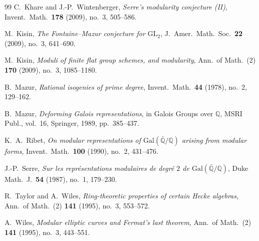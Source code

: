 \documentclass[12pt]{amsart}
\theoremstyle{definition}
\theoremstyle{remark}
\newcommand{\Gal}{\mathrm{Gal}}
\newcommand{\GL}{\mathrm{GL}}
\begin{document}
\begin{thebibliography}{99}
 C.~Khare and J.-P.~Wintenberger, \emph{Serre's modularity conjecture (II)}, Invent.\ Math.\ \textbf{178} (2009), no.~3, 505--586.

 M.~Kisin, \emph{The Fontaine--Mazur conjecture for $\GL_2$}, J.\ Amer.\ Math.\ Soc.\ \textbf{22} (2009), no.~3, 641--690.

 M.~Kisin, \emph{Moduli of finite flat group schemes, and modularity}, Ann.\ of Math.\ (2) \textbf{170} (2009), no.~3, 1085--1180.

 B.~Mazur, \emph{Rational isogenies of prime degree}, Invent.\ Math.\ \textbf{44} (1978), no.~2, 129--162.

 B.~Mazur, \emph{Deforming Galois representations}, in Galois Groups over $\mathbb{Q}$, MSRI Publ., vol.~16, Springer, 1989, pp.~385--437.

 K.~A.~Ribet, \emph{On modular representations of $\Gal(\bar{\mathbb{Q}}/\mathbb{Q})$ arising from modular forms}, Invent.\ Math.\ \textbf{100} (1990), no.~2, 431--476.

 J.-P.~Serre, \emph{Sur les repr\'esentations modulaires de degr\'e $2$ de $\Gal(\bar{\mathbb{Q}}/\mathbb{Q})$}, Duke Math.\ J.\ \textbf{54} (1987), no.~1, 179--230.

 R.~Taylor and A.~Wiles, \emph{Ring-theoretic properties of certain Hecke algebras}, Ann.\ of Math.\ (2) \textbf{141} (1995), no.~3, 553--572.

 A.~Wiles, \emph{Modular elliptic curves and Fermat's last theorem}, Ann.\ of Math.\ (2) \textbf{141} (1995), no.~3, 443--551.

\end{thebibliography}
\end{document}
